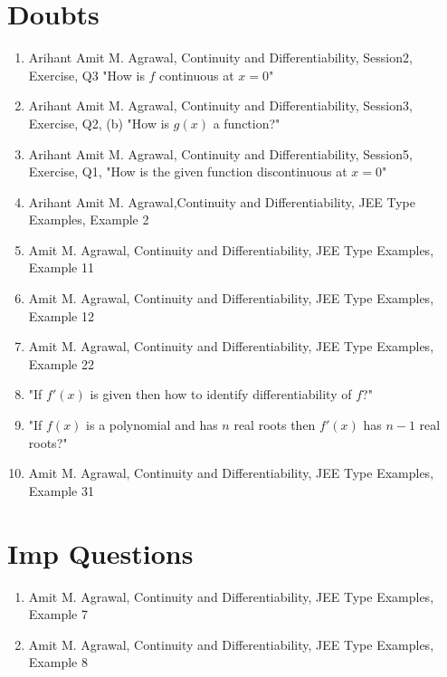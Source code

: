 \documentclass{article}
\title{}
\author{}
\date{}
\begin{document}
\maketitle

\section{Doubts}
\begin{enumerate}
    \item Arihant Amit M. Agrawal, Continuity and Differentiability, Session2, Exercise, Q3 "How is $f$ continuous at $x=0$"
    \item Arihant Amit M. Agrawal, Continuity and Differentiability, Session3, Exercise, Q2, (b) "How is $g(x)$ a function?"
    \item Arihant Amit M. Agrawal, Continuity and Differentiability, Session5, Exercise, Q1, "How is the given function discontinuous at $x=0$"
    \item Arihant Amit M. Agrawal,Continuity and Differentiability, JEE Type Examples, Example 2
    \item Amit M. Agrawal, Continuity and Differentiability, JEE Type Examples, Example 11
    \item Amit M. Agrawal, Continuity and Differentiability, JEE Type Examples, Example 12
    \item Amit M. Agrawal, Continuity and Differentiability, JEE Type Examples, Example 22
    \item "If $f'(x)$ is given then how to identify differentiability of $f$?"
    \item "If $f(x)$ is a polynomial and has $n$ real roots then $f'(x)$ has $n-1$ real roots?"
    \item Amit M. Agrawal, Continuity and Differentiability, JEE Type Examples, Example 31
\end{enumerate}
\section{Imp Questions}
\begin{enumerate}
    \item Amit M. Agrawal, Continuity and Differentiability, JEE Type Examples, Example 7
    \item Amit M. Agrawal, Continuity and Differentiability, JEE Type Examples, Example 8
\end{enumerate}
\end{document}
